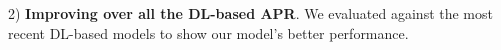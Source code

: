 
2) {\bf Improving over all the DL-based APR}. We evaluated {\tool}
against the most recent DL-based models to show our model's better
performance.




